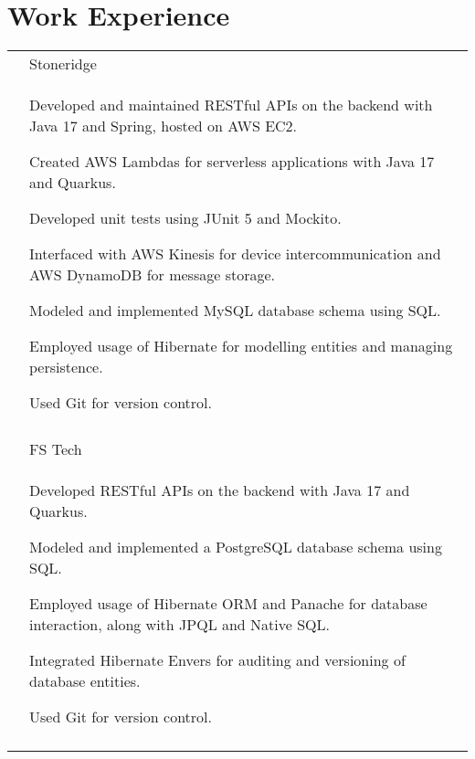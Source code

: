 \documentclass[a4paper,12pt]{article}
\begin{document}
\section{Work Experience}
\begin{longtable}{r|p{14.3cm}}

& \large{Stoneridge} \\*
&\small{
\begin{itemize*}[label=\Large\textbullet]
    \item Developed and maintained RESTful APIs on the backend with Java 17 and Spring, hosted on AWS EC2.
    \item Created AWS Lambdas for serverless applications with Java 17 and Quarkus.
    \item Developed unit tests using JUnit 5 and Mockito.
    \item Interfaced with AWS Kinesis for device intercommunication and AWS DynamoDB for \mbox{message} storage.
    \item Modeled and implemented MySQL database schema using SQL.
    \item \mbox{Employed} usage of Hibernate for modelling entities and \mbox{managing} persistence.
    \item Used Git for version control.
    \end{itemize*}
}
\\ \\

 & \large{FS Tech} \\*
 &\small{
    \begin{itemize*}[label=\Large\textbullet]
        \item Developed RESTful APIs on the backend with Java 17 and Quarkus.
        \item Modeled and \mbox{implemented} a PostgreSQL database schema using SQL.
        \item Employed usage of Hibernate ORM and Panache for database interaction, along with JPQL and Native SQL.
        \item \mbox{Integrated} Hibernate Envers for auditing and versioning of database entities.
        \item Used Git for version control.
     \end{itemize*}
 }
 \\ \\



\end{longtable}
\end{document}
